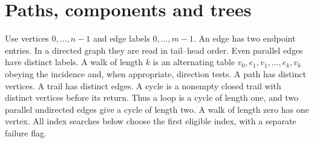 \section{Paths, components and trees}
\label{stpaths}
Use vertices $0,\ldots,n-1$ and edge labels $0,\ldots,m-1$. An edge has two endpoint entries. In a directed graph they are read in tail--head order. Even parallel edges have distinct labels. A walk of length $k$ is an alternating table $v_0,e_1,v_1,\ldots,e_k,v_k$ obeying the incidence and, when appropriate, direction tests. A path has distinct vertices. A trail has distinct edges. A cycle is a nonempty closed trail with distinct vertices before its return. Thus a loop is a cycle of length one, and two parallel undirected edges give a cycle of length two. A walk of length zero has one vertex. All index searches below choose the first eligible index, with a separate failure flag.

